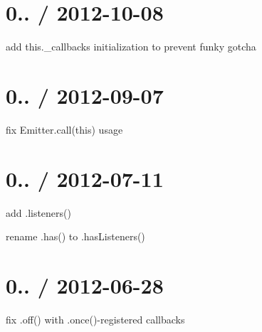 \section*{0.. / 2012-\/10-\/08 }


\begin{DoxyItemize}
\item add {\ttfamily this.\+\_\+callbacks} initialization to prevent funky gotcha
\end{DoxyItemize}

\section*{0.. / 2012-\/09-\/07 }


\begin{DoxyItemize}
\item fix {\ttfamily Emitter.\+call(this)} usage
\end{DoxyItemize}

\section*{0.. / 2012-\/07-\/11 }


\begin{DoxyItemize}
\item add {\ttfamily .listeners()}
\item rename {\ttfamily .has()} to {\ttfamily .has\+Listeners()}
\end{DoxyItemize}

\section*{0.. / 2012-\/06-\/28 }


\begin{DoxyItemize}
\item fix {\ttfamily .off()} with {\ttfamily .once()}-\/registered callbacks 
\end{DoxyItemize}
